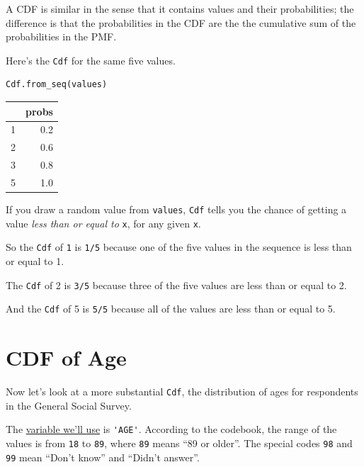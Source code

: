 A CDF is similar in the sense that it contains values and their
probabilities; the difference is that the probabilities in the CDF are
the the cumulative sum of the probabilities in the PMF.

Here's the \passthrough{\lstinline!Cdf!} for the same five values.

\begin{lstlisting}[language=Python]
Cdf.from_seq(values)
\end{lstlisting}

\begin{tabular}{lr}
\toprule
{} &  probs \\
\midrule
1 &    0.2 \\
2 &    0.6 \\
3 &    0.8 \\
5 &    1.0 \\
\bottomrule
\end{tabular}

If you draw a random value from \passthrough{\lstinline!values!},
\passthrough{\lstinline!Cdf!} tells you the chance of getting a value
\emph{less than or equal to} \passthrough{\lstinline!x!}, for any given
\passthrough{\lstinline!x!}.

So the \passthrough{\lstinline!Cdf!} of \passthrough{\lstinline!1!} is
\passthrough{\lstinline!1/5!} because one of the five values in the
sequence is less than or equal to 1.

The \passthrough{\lstinline!Cdf!} of 2 is \passthrough{\lstinline!3/5!}
because three of the five values are less than or equal to 2.

And the \passthrough{\lstinline!Cdf!} of 5 is
\passthrough{\lstinline!5/5!} because all of the values are less than or
equal to 5.

\hypertarget{cdf-of-age}{%
\section{CDF of Age}\label{cdf-of-age}}

Now let's look at a more substantial \passthrough{\lstinline!Cdf!}, the
distribution of ages for respondents in the General Social Survey.

The \href{https://gssdataexplorer.norc.org/variables/53/vshow}{variable
we'll use} is \passthrough{\lstinline!'AGE'!}. According to the
codebook, the range of the values is from \passthrough{\lstinline!18!}
to \passthrough{\lstinline!89!}, where \passthrough{\lstinline!89!}
means ``89 or older''. The special codes \passthrough{\lstinline!98!}
and \passthrough{\lstinline!99!} mean ``Don't know'' and ``Didn't
answer''.

